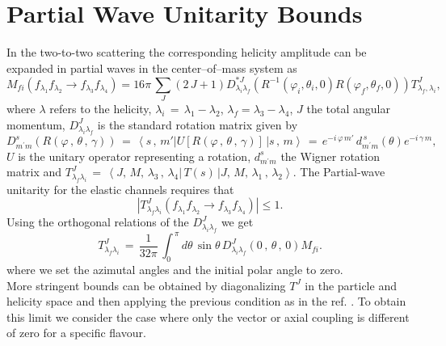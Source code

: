 \documentclass[prd,amsfonts,onecolumn,superscriptaddress,aps,nofootinbib,11pt]{revtex4-1}
\begin{document}
\section{Partial Wave Unitarity Bounds}
\label{appendix:unitarity}

In the two-to-two scattering the corresponding helicity amplitude can be expanded in partial waves in the center–of–mass system as \cite{JACOB2000774} 
\begin{equation}
 M_{fi}\left(f_{\lambda_1} f_{\lambda_2} \rightarrow f_{\lambda_3} f_{\lambda_4}\right) = 16\pi\, \sum_{J} (2\,J+1)D^{*J}_{\lambda_i\lambda_f}(R^{-1}(\varphi_i,\theta_i,0)R(\varphi_f,\theta_f,0))T^{J}_{\lambda_f,\lambda_i},
\end{equation}
where $\lambda$ refers to the helicity, $\lambda_i \,=\, \lambda_1 - \lambda_2$, $\lambda_f = \lambda_3 - \lambda_4$, $J$ the total angular momentum, $D^J_{\lambda_i \lambda_f}$ is the standard rotation matrix given by 
\begin{equation}
D^{s}_{m^{\prime}m}\left(R\left(\varphi\,,\,\theta\,,\,\gamma\right)\right) \,=\, \left\langle s\,,\,m'\right| U\left[R\left(\varphi\,,\,\theta\,,\,\gamma \right)\right] \,\left|s\,,\,m \right\rangle \,=\, e^{-i \,\varphi\, m'}\, d^{\,s}_{m^{\prime}m}\left(\theta\right)e^{-i\, \gamma\, m},
\end{equation}
$U$ is the unitary operator representing a rotation, $d^{s}_{m^{\prime}m}$ the Wigner rotation matrix and $T^J_{\lambda_f\lambda_i} \,=\, \left\langle J,\,M,\,\lambda_3\,,\,\lambda_4|\,T(s)\,| J,\,M,\,\lambda_1\,,\,\lambda_2\right\rangle$. The Partial-wave unitarity for the elastic channels requires that
\begin{equation}
\left|T^{J}_{\lambda_f \lambda_i}\left(f_{\lambda_1} f_{\lambda_2} \rightarrow f_{\lambda_3} f_{\lambda_4}\right) \right| \leq 1.  
\end{equation}
\indent Using the orthogonal relations of the $D^{J}_{\lambda_i \lambda_f}$ we get
\begin{equation}
T^J_{\lambda_f\lambda_i} \,=\, \frac{1}{32\pi}\, \int_{0}^{\,\pi} d\theta\, \sin\theta\, D^J_{\lambda_i\lambda_f}\left(0\,,\,\theta\,,\,0\right) M_{fi}.
\end{equation}
where we set the azimutal angles and the initial polar angle to zero. \\
\indent More stringent bounds can be obtained by diagonalizing $T^J$ in the particle and helicity space and then applying the previous condition as in the ref. \cite{Lee}. To obtain this limit we consider the case where only the vector or axial coupling is different of zero for a specific flavour.
\end{document}
